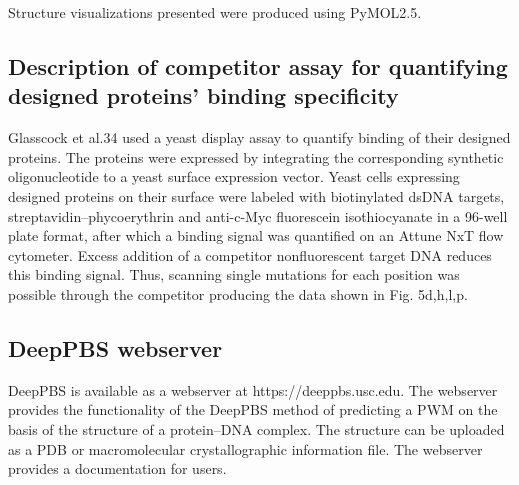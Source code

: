 
Structure visualizations presented were produced using PyMOL2.5.

\subsection{Description of competitor assay for quantifying designed proteins’ binding specificity}

Glasscock et al.34 used a yeast display assay to quantify binding of their designed proteins. The proteins were expressed by integrating the corresponding synthetic oligonucleotide to a yeast surface expression vector. Yeast cells expressing designed proteins on their surface were labeled with biotinylated dsDNA targets, streptavidin–phycoerythrin and anti-c-Myc fluorescein isothiocyanate in a 96-well plate format, after which a binding signal was quantified on an Attune NxT flow cytometer. Excess addition of a competitor nonfluorescent target DNA reduces this binding signal. Thus, scanning single mutations for each position was possible through the competitor producing the data shown in Fig. 5d,h,l,p.
\\
\subsection{DeepPBS webserver}
DeepPBS is available as a webserver at https://deeppbs.usc.edu. The webserver provides the functionality of the DeepPBS method of predicting a PWM on the basis of the structure of a protein–DNA complex. The structure can be uploaded as a PDB or macromolecular crystallographic information file. The webserver provides a documentation for users.
